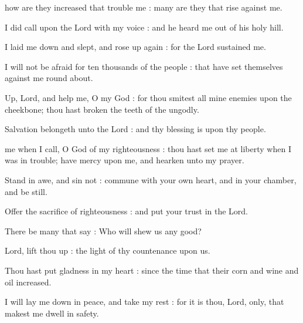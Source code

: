 
 how are they increased that trouble me : many are they that rise against me.\par
{}
I did call upon the Lord with my voice : and he heard me out of his holy hill.\par
{}I laid me down and slept, and rose up again : for the Lord sustained me.\par
{}I will not be afraid for ten thousands of the people : that have set themselves against me round about.\par
{}Up, Lord, and help me, O my God : for thou smitest all mine enemies upon the cheekbone; thou hast broken the teeth of the ungodly.\par
{}Salvation belongeth unto the Lord : and thy blessing is upon thy people.\par


 me when I call, O God of my righteousness : thou hast set me at liberty when I was in trouble; have mercy upon me, and hearken unto my prayer.\par
{}
Stand in awe, and sin not : commune with your own heart, and in your chamber, and be still.\par
{}Offer the sacrifice of righteousness : and put your trust in the Lord.\par
{}There be many that say : Who will shew us any good?\par
{}Lord, lift thou up : the light of thy countenance upon us.\par
{}Thou hast put gladness in my heart : since the time that their corn and wine and oil increased.\par
{}I will lay me down in peace, and take my rest : for it is thou, Lord, only, that makest me dwell in safety.\par

